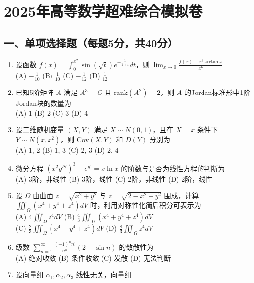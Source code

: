 \documentclass[UTF8]{ctexart}
\author{}
\date{}
\begin{document}
\section{2025年高等数学超难综合模拟卷}\label{2025ux5e74ux9ad8ux7b49ux6570ux5b66ux8d85ux96beux7efcux5408ux6a21ux62dfux5377}

\subsection{一、单项选择题（每题5分，共40分）}\label{ux4e00ux5355ux9879ux9009ux62e9ux9898ux6bcfux98985ux5206ux517140ux5206uxff09}

\begin{enumerate}
\def\labelenumi{\arabic{enumi}.}
\item
  设函数
  \( f(x) = \int_0^{x^2} \sin(\sqrt{t}) e^{-\frac{1}{1+t}} dt \)，则
  \( \lim_{x \to 0} \frac{f(x) - x^3 \arctan x}{x^6} = \)\\
  (A) \( -\frac{1}{10} \) (B) \( \frac{1}{10} \) (C) \( -\frac{1}{12} \)
  (D) \( \frac{1}{12} \)
\item
  已知5阶矩阵 \( A \) 满足 \( A^3 = O \) 且
  \( \text{rank}(A^2) = 2 \)，则 \( A \)
  的Jordan标准形中1阶Jordan块的数量为\\
  (A) 1 (B) 2 (C) 3 (D) 4
\item
  设二维随机变量 \( (X,Y) \) 满足 \( X \sim N(0,1) \)，且在 \( X=x \)
  条件下 \( Y \sim N(x, x^2) \)，则 \( \text{Cov}(X,Y) \) 和 \( D(Y) \)
  分别为\\
  (A) 1, 2 (B) 1, 3 (C) 2, 3 (D) 2, 4
\item
  微分方程 \( (x^2 y''')^3 + e^{y'} = x \ln x \)
  的阶数与是否为线性方程的判断为\\
  (A) 3阶，非线性 (B) 3阶，线性 (C) 2阶，非线性 (D) 2阶，线性
\item
  设 \( \Omega \) 由曲面 \( z = \sqrt{x^2 + y^2} \) 与
  \( z = \sqrt{2 - x^2 - y^2} \) 围成，计算
  \( \iiint_{\Omega} (x^4 + y^4 + z^4) dV \)
  时，利用对称性化简后积分可表示为\\
  (A) \( 4 \iiint_{\Omega} z^4 dV \) (B)
  \( \frac{4}{3} \iiint_{\Omega} (x^4 + y^4 + z^4) dV \)\\
  (C) \( \frac{2}{3} \iiint_{\Omega} (x^4 + y^4 + z^4) dV \) (D)
  \( \frac{8}{3} \iiint_{\Omega} z^4 dV \)
\item
  级数 \( \sum_{n=1}^{\infty} \frac{(-1)^n n!}{n^n} (2+\sin n) \)
  的敛散性为\\
  (A) 绝对收敛 (B) 条件收敛 (C) 发散 (D) 无法判断
\item
  设向量组 \( \alpha_1, \alpha_2, \alpha_3 \) 线性无关，向量组

\end{enumerate}
\end{document}
